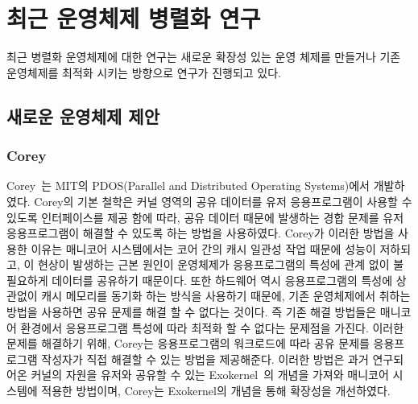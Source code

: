 
\newpage
\section{최근 운영체제 병렬화 연구}
\label{sec:osrelated}


최근 병렬화 운영체제에 대한 연구는 새로운 확장성 있는 운영 체제를 만들거나 
기존 운영체제를 최적화 시키는 방향으로 연구가 진행되고 있다.


\subsection{새로운 운영체제 제안}

\subsubsection{Corey}
Corey~\cite{Boyd-WickizerCorey}는 MIT의 PDOS(Parallel and Distributed Operating
Systems)에서 개발하였다.
Corey의 기본 철학은 커널 영역의 공유 데이터를 유저 응용프로그램이 사용할 수 있도록 인터페이스를 제공 함에 따라,
공유 데이터 때문에 발생하는 경합 문제를 유저 응용프로그램이 해결할 수 있도록 하는 방법을 사용하였다.
Corey가 이러한 방법을 사용한 이유는 매니코어 시스템에서는 코어 간의 캐시 일관성 작업 
때문에 성능이 저하되고, 이 현상이 발생하는 근본 원인이 운영체제가 응용프로그램의 특성에 관계 없이 
불필요하게 데이터를 공유하기 때문이다.
또한 하드웨어 역시 응용프로그램의 특성에 상관없이 캐시 메모리를 동기화 하는 방식을 사용하기 때문에,
기존 운영체제에서 취하는 방법을 사용하면 공유 문제를 해결 할 수 없다는 것이다.  
즉 기존 해결 방법들은 매니코어 환경에서 응용프로그램 특성에 따라 최적화 할 수 없다는 문제점을 가진다. 
이러한 문제를 해결하기 위해, Corey는 응용프로그램의 워크로드에 따라 공유 문제를 응용프로그램 작성자가 
직접 해결할 수 있는 방법을 제공해준다.
이러한 방법은 과거 연구되어온 커널의 자원을 유저와 공유할 수 있는 Exokernel~\cite{Engler1995EOS}의 개념을 가져와 
매니코어 시스템에 적용한 방법이며, Corey는 Exokernel의 개념을 통해 확장성을 개선하였다.


